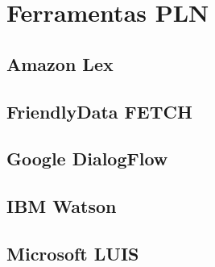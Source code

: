 \section{Ferramentas PLN}
\label{sec:chap03_existingtools}
\tbd

\subsection{Amazon Lex}
\tbd

\subsection{FriendlyData FETCH}
\tbd

\subsection{Google DialogFlow}
\tbd

\subsection{IBM Watson}
\tbd

\subsection{Microsoft LUIS}
\tbd
